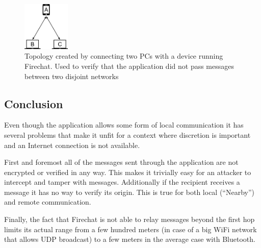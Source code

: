 \begin{figure}[ht!]
  \centering
  \includegraphics[width=0.2\textwidth]{img/diagram2.png} 
  \caption{Topology created by connecting two PCs with a device running Firechat. Used to verify that the application did not pass messages between two disjoint networks}
\end{figure}

\subsection{Conclusion}
Even though the application allows some form of local communication it has several problems that make it unfit for a context where discretion is important and an Internet connection is not available.

First and foremost all of the messages sent through the application are not encrypted or verified in any way. This makes it trivially easy for an attacker to intercept and tamper with messages.
Additionally if the recipient receives a message it has no way to verify its origin. This is true for both local (``Nearby'') and remote communication.

Finally, the fact that Firechat is not able to relay messages beyond the first hop limits its actual range from a few hundred meters (in case of a big WiFi network that allows UDP broadcast) to a few meters in the average case with Bluetooth.